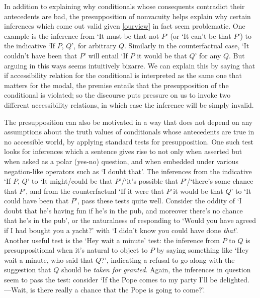 \documentclass[If.tex]{subfiles}
\begin{document}
In addition to explaining why conditionals whose consequents contradict their antecedents are bad, the presupposition of nonvacuity helps explain why certain inferences which come out valid given \ref{ourview} in fact seem problematic.  One example is the inference from ‘It must be that not-$P$’ (or ‘It can't be that $P$’) to the indicative ‘If $P$, $Q$’, for arbitrary $Q$.   Similarly in the counterfactual case, ‘It couldn't have been that $P$’ will entail ‘If $P$ it would be that $Q$’ for any $Q$.  But arguing in this ways seems intuitively bizarre.  We can explain this by saying that if accessibility relation for the conditional is interpreted as the same one that matters for the modal, the premise entails that the presupposition of the conditional is violated; so the discourse puts pressure on us to invoke two different accessibility relations, in which case the inference will be simply invalid.

The presupposition can also be motivated in a way that does not depend on any assumptions about the truth values of conditionals whose antecedents are true in no accessible world, by applying standard tests for presupposition.  One such test looks for inferences which a sentence gives rise to not only when asserted but when asked as a polar (yes-no) question, and when embedded under various negation-like operators such as ‘I doubt that’.  The inferences from the indicative ‘If $P$, $Q$’ to ‘It might/could be that $P$’/‘it's possible that $P$’/‘there's some chance that $P$’, and from the counterfactual ‘If it were that $P$ it would be that $Q$’ to ‘It could have been that $P$’, pass these tests quite well.  Consider the oddity of ‘I doubt that he's having fun if he's in the pub, and moreover there's no chance that he's in the pub’, or the naturalness of responding to ‘Would you have agreed if I had bought you a yacht?’ with ‘I didn't know you could have done \emph{that}’.  Another useful test \citep{FintelWYBI} is the ‘Hey wait a minute’ test: the inference from $P$ to $Q$ is presuppositional when it's natural to object to $P$ by saying something like ‘Hey wait a minute, who said that $Q$?’, indicating a refusal to go along with the suggestion that $Q$ should be \emph{taken for granted}.  Again, the inferences in question seem to pass the test: consider ‘If the Pope comes to my party I'll be delighted.  ---Wait, is there really a chance that the Pope is going to come?’.  
\end{document}
